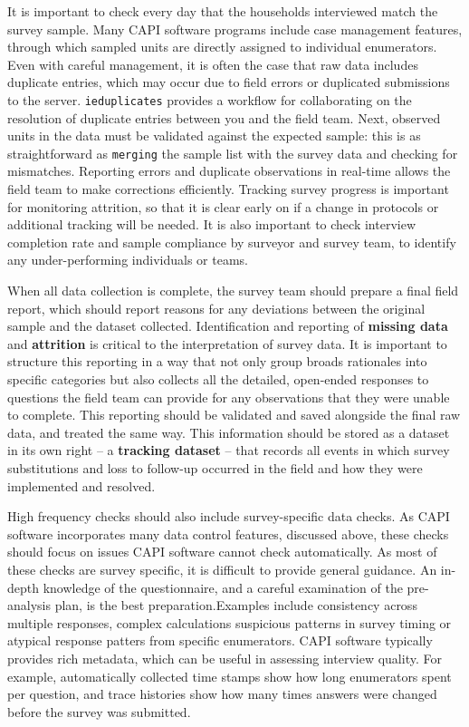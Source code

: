 It is important to check every day that the households interviewed match the survey sample.
Many CAPI software programs include case management features, through which sampled units are directly assigned to individual enumerators.
Even with careful management, it is often the case that raw data includes duplicate entries, which may occur due to field errors or duplicated submissions to the server.
\texttt{ieduplicates}
provides a workflow for collaborating on the resolution of duplicate entries between you and the field team.
Next, observed units in the data must be validated against the expected sample:
this is as straightforward as \texttt{merging} the sample list with the survey data and checking for mismatches.
Reporting errors and duplicate observations in real-time allows the field team to make corrections efficiently.
Tracking survey progress is important for monitoring attrition, so that it is clear early on if a change in protocols or additional tracking will be needed.
It is also important to check interview completion rate and sample compliance by surveyor and survey team, to identify any under-performing individuals or teams.

When all data collection is complete, the survey team should prepare a final field report, which should report reasons for any deviations between the original sample and the dataset collected.
Identification and reporting of \textbf{missing data} and \textbf{attrition} is critical to the interpretation of survey data.
It is important to structure this reporting in a way that not only group broads rationales into specific categories
but also collects all the detailed, open-ended responses to questions the field team can provide for any observations that they were unable to complete.
This reporting should be validated and saved alongside the final raw data, and treated the same way.
This information should be stored as a dataset in its own right -- a \textbf{tracking dataset} -- that records all events in which survey substitutions
and loss to follow-up occurred in the field and how they were implemented and resolved.

High frequency checks should also include survey-specific data checks. As CAPI software incorporates many data control features, discussed above, these checks should focus on issues CAPI software cannot check automatically. As most of these checks are survey specific, it is difficult to provide general guidance. An in-depth knowledge of the questionnaire, and a careful examination of the pre-analysis plan, is the best preparation.Examples include  consistency across multiple responses, complex calculations suspicious patterns in survey timing or atypical response patters from specific enumerators.  CAPI software typically provides rich metadata, which can be useful in assessing interview quality. For example, automatically collected time stamps show how long enumerators spent per question, and trace histories show how many times answers were changed before the survey was submitted.


